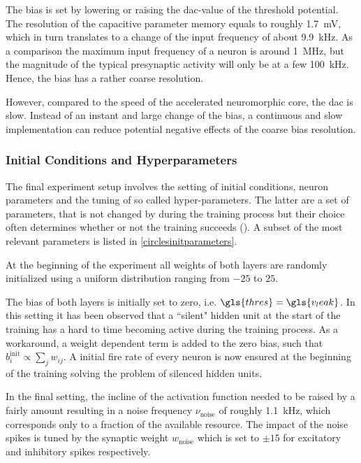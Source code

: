 The bias is set by lowering or raising the \gls{dac}-value of the threshold potential. The resolution of the capacitive parameter memory equals to roughly \SI{1.7}{\milli \V}, which in turn translates to a change of the input frequency of about \SI{9.9}{\kilo \Hz}. As a comparison the maximum input frequency of a neuron is around \SI{1}{\mega \Hz}, but the magnitude of the typical presynaptic activity will only be at a few \SI{100}{\kilo \Hz}. Hence, the bias has a rather coarse resolution.

However, compared to the speed of the accelerated neuromorphic core, the \acrlong{dac} is slow. Instead of an instant and large change of the bias, a continuous and slow implementation can reduce potential negative effects of the coarse bias resolution.

\subsubsection*{Initial Conditions and Hyperparameters}

The final experiment setup involves the setting of initial conditions, neuron parameters and the tuning of so called hyper-parameters. The latter are a set of parameters, that is not changed by during the training process but their choice often determines whether or not the training succeeds (\citealp{Goodfellow-et-al-2016}). A subset of the most relevant parameters is listed in \cref{circlesinitparameters}.

At the beginning of the experiment all weights of both layers are randomly initialized using a uniform distribution ranging from $-25$ to $25$. 

The bias of both layers is initially set to zero, i.e. $\gls{thres} = \gls{v_leak}$. In this setting it has been observed that a ``silent" hidden unit at the start of the training has a hard to time becoming active during the training process. As a workaround, a weight dependent term is added to the zero bias, such that $b_i^\text{init} \propto \sum_j w_{ij}$. A initial fire rate of every neuron is now ensured at the beginning of the training solving the problem of silenced hidden units.

In the final setting, the incline of the activation function needed to be raised by a fairly amount resulting in a noise frequency $\nu_\text{noise}$ of roughly \SI{1.1}{\kilo \Hz}, which corresponds only to a fraction of the available resource. The impact of the noise spikes is tuned by the synaptic weight $w_\text{noise}$ which is set to $\pm 15$ for excitatory and inhibitory spikes respectively.

